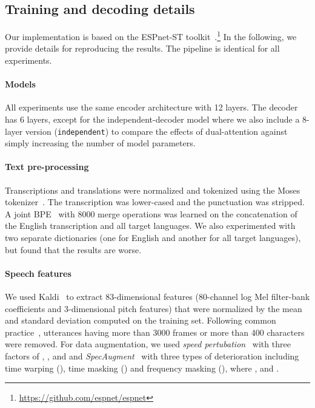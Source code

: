 \documentclass[11pt]{article}
\theoremstyle{plain}
\theoremstyle{definition}
\newcommand{\var}[1]{\texttt{#1}}
\begin{document}
\subsection{Training and decoding details}\label{sec:training-details}
Our implementation is based on the ESPnet-ST toolkit~\cite{inaguma2020espnet}.\footnote{\url{https://github.com/espnet/espnet}} In the following, we provide details for reproducing the results. The pipeline is identical for all experiments.


\paragraph{Models}
All experiments use the same encoder architecture with 12 layers.
The decoder has 6 layers, except for the independent-decoder model where we also include a 8-layer version (\var{independent}) to compare the effects of dual-attention against simply increasing the number of model parameters.

\paragraph{Text pre-processing} Transcriptions and translations were normalized and tokenized using the Moses tokenizer~\cite{koehn2007moses}. The transcription was lower-cased and the punctuation was stripped. A joint BPE~\cite{sennrich2016neural} with 8000 merge operations was learned on the concatenation of the English transcription and all target languages. {We also experimented with two separate dictionaries (one for English and another for all target languages), but found that the results are worse.}

\paragraph{Speech features} We used Kaldi~\cite{povey2011kaldi} to extract 83-dimensional features (80-channel log Mel filter-bank coefficients and 3-dimensional pitch features) that were normalized by the mean and standard deviation computed on the training set.
Following common practice~\cite{inaguma2019multilingual,wang2020curriculum}, utterances having more than 3000 frames or more than 400 characters were removed. For data augmentation, we used \emph{speed pertubation}~\cite{ko2015audio} with three factors of , , and  and \emph{SpecAugment}~\cite{daniel2019spec} with three types of deterioration including time warping (), time masking () and frequency masking (), where , and .
\end{document}
